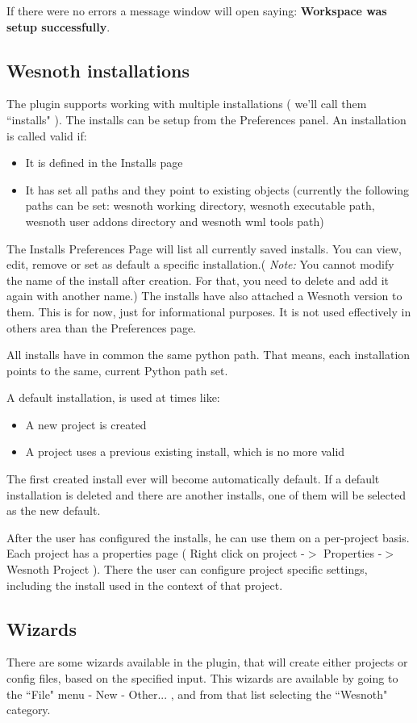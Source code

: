 \documentclass[10pt]{article}
\begin{document}
If there were no errors a message window will open saying: \textbf{Workspace was setup successfully}.

\subsection{Wesnoth installations}
The plugin supports working with multiple installations ( we'll call them ``installs" ). The installs can be setup from the Preferences panel. An installation is called valid if:
\begin{itemize}
  \item It is defined in the Installs page
  \item It has set all paths and they point to existing objects (currently the following paths can be set: wesnoth working directory, wesnoth executable path, wesnoth user addons directory and wesnoth wml tools path)
\end{itemize}

The Installs Preferences Page will list all currently saved installs. You can view, edit, remove or set as default a specific installation.( \textit{Note:} You cannot modify the name of the install after creation. For that, you need to delete and add it again with another name.) The installs have also attached a Wesnoth version to them. This is for now, just for informational purposes. It is not used effectively in others area than the Preferences page.

All installs have in common the same python path. That means, each installation points to the same, current Python path set.

A default installation, is used at times like:
\begin{itemize}
  \item A new project is created
  \item A project uses a previous existing install, which is no more valid
\end{itemize}
The first created install ever will become automatically default. If a default installation is deleted and there are another installs, one of them will be selected as the new default.

After the user has configured the installs, he can use them on a per-project basis. Each project has a properties page ( Right click on project -$>$ Properties -$>$ Wesnoth Project ). There the user can configure project specific settings, including the install used in the context of that project.

\subsection{Wizards}
There are some wizards available in the plugin, that will create either projects or config files, based on the specified input. This wizards are available by going to the ``File" menu - New - Other... , and from that list selecting the ``Wesnoth" category.
\end{document}
